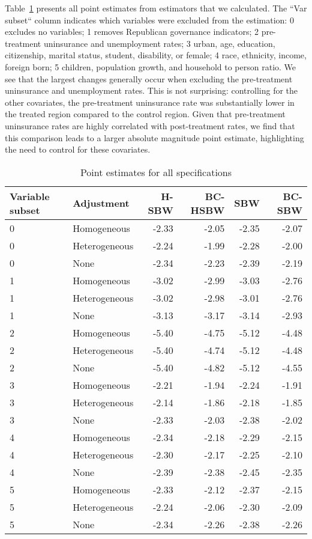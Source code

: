 Table~\ref{tab:ptests} presents all point estimates from estimators that we calculated. The ``Var subset`` column indicates which variables were excluded from the estimation: 0 excludes no variables; 1 removes Republican governance indicators; 2 pre-treatment uninsurance and unemployment rates; 3 urban, age, education, citizenship, marital status, student, disability, or female; 4 race, ethnicity, income, foreign born; 5 children, population growth, and household to person ratio. We see that the largest changes generally occur when excluding the pre-treatment uninsurance and unemployment rates. This is not surprising: controlling for the other covariates, the pre-treatment uninsurance rate was substantially lower in the treated region compared to the control region. Given that pre-treatment uninsurance rates are highly correlated with post-treatment rates, we find that this comparison leads to a larger absolute magnitude point estimate, highlighting the need to control for these covariates.

\begin{table}[ht]
\centering
\caption{Point estimates for all specifications}
\label{tab:ptests}
\begin{tabular}{llrrrr}
  \hline
Variable subset & Adjustment & H-SBW & BC-HSBW & SBW & BC-SBW \\ 
  \hline
0 & Homogeneous & -2.33 & -2.05 & -2.35 & -2.07 \\ 
  0 & Heterogeneous & -2.24 & -1.99 & -2.28 & -2.00 \\ 
  0 & None & -2.34 & -2.23 & -2.39 & -2.19 \\ 
  1 & Homogeneous & -3.02 & -2.99 & -3.03 & -2.76 \\ 
  1 & Heterogeneous & -3.02 & -2.98 & -3.01 & -2.76 \\ 
  1 & None & -3.13 & -3.17 & -3.14 & -2.93 \\ 
  2 & Homogeneous & -5.40 & -4.75 & -5.12 & -4.48 \\ 
  2 & Heterogeneous & -5.40 & -4.74 & -5.12 & -4.48 \\ 
  2 & None & -5.40 & -4.82 & -5.12 & -4.55 \\ 
  3 & Homogeneous & -2.21 & -1.94 & -2.24 & -1.91 \\ 
  3 & Heterogeneous & -2.14 & -1.86 & -2.18 & -1.85 \\ 
  3 & None & -2.33 & -2.03 & -2.38 & -2.02 \\ 
  4 & Homogeneous & -2.34 & -2.18 & -2.29 & -2.15 \\ 
  4 & Heterogeneous & -2.30 & -2.17 & -2.25 & -2.10 \\ 
  4 & None & -2.39 & -2.38 & -2.45 & -2.35 \\ 
  5 & Homogeneous & -2.33 & -2.12 & -2.37 & -2.15 \\ 
  5 & Heterogeneous & -2.24 & -2.06 & -2.30 & -2.09 \\ 
  5 & None & -2.34 & -2.26 & -2.38 & -2.26 \\ 
   \hline
\end{tabular}
\end{table}

